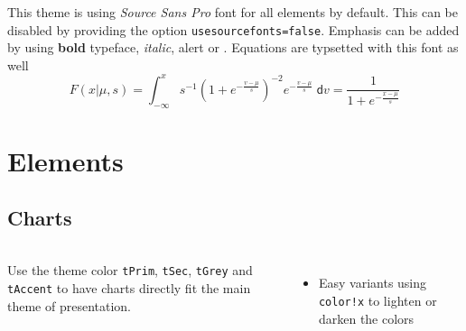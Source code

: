 \begin{frame}
  \frametitle{\insertsectionhead}
  \framesubtitle{\insertsubsectionhead}
  This theme is using \textit{Source Sans Pro} font for all elements by default.
  This can be disabled by providing the option \texttt{usesourcefonts=false}.
  \vfill
  Emphasis can be added by using \textbf{bold} typeface, \textit{italic},
  \alert{alert} or {\color{tPrim}{simple colors}}.
  \vfill
  Equations are typsetted with this font as well
  \begin{equation*}
    F(x|\mu,s) = \int_{-\infty}^x s^{-1}\left(1+e^{-\frac{v-\mu}{s}}\right)^{-2} e^{-\frac{v-\mu}{s}}\;\mathsf{d}v = \frac{1}{1+e^{-\frac{x-\mu}{s}}}
  \end{equation*}
\end{frame}


\section{Elements}
\subsection{Charts}
\begin{frame}{\insertsectionhead}
  \framesubtitle{\insertsubsectionhead}
  \begin{columns}[c, onlytextwidth]
    Use the theme color \texttt{tPrim}, \texttt{tSec}, \texttt{tGrey} and
    \texttt{tAccent} to have charts directly fit the main theme of presentation.
    \vfill
    \begin{itemize}
      \item Easy variants using \texttt{color!x} to lighten or darken the colors
    \end{itemize}
    \hfill
    \center
  \end{columns}
\end{frame}

